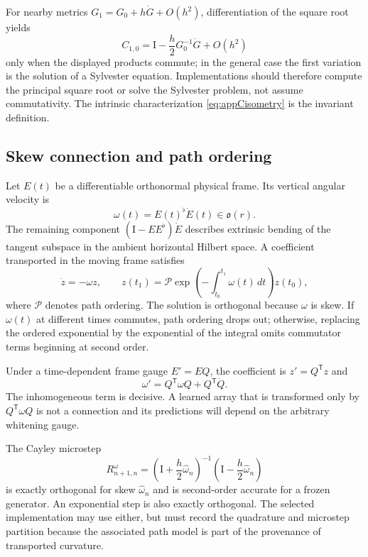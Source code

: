 \documentclass[10pt,twocolumn]{article}
\theoremstyle{definition}
\theoremstyle{remark}
\newcommand{\Id}{\mathrm I}
\begin{document}
For nearby metrics $G_1=G_0+h\dot G+O(h^2)$, differentiation of the square
root yields
\begin{equation}
 C_{1,0}=\Id-\frac{h}{2}G_0^{-1}\dot G+O(h^2)
 \label{eq:appClocal}
\end{equation}
only when the displayed products commute; in the general case the first
variation is the solution of a Sylvester equation.  Implementations should
therefore compute the principal square root or solve the Sylvester problem,
not assume commutativity.  The intrinsic characterization
\eqref{eq:appCisometry} is the invariant definition.

\subsection{Skew connection and path ordering}

Let $E(t)$ be a differentiable orthonormal physical frame.  Its vertical
angular velocity is
\begin{equation}
 \omega(t)=E(t)^\flat\dot E(t)\in\mathfrak o(r).
 \label{eq:appomega}
\end{equation}
The remaining component
$(\Id-E E^\flat)\dot E$ describes extrinsic bending of the tangent subspace in
the ambient horizontal Hilbert space.  A coefficient transported in the
moving frame satisfies
\begin{equation}
 \dot z=-\omega z,\qquad
 z(t_1)=\mathcal P\exp\!\left(-\int_{t_0}^{t_1}\omega(t)\,dt\right)z(t_0),
 \label{eq:apppathordered}
\end{equation}
where $\mathcal P$ denotes path ordering.  The solution is orthogonal because
$\omega$ is skew.  If $\omega(t)$ at different times commutes, path ordering
drops out; otherwise, replacing the ordered exponential by the exponential
of the integral omits commutator terms beginning at second order.

Under a time-dependent frame gauge $E'=EQ$, the coefficient is
$z'=Q^{\mathsf T}z$ and
\begin{equation}
 \omega'=Q^{\mathsf T}\omega Q+Q^{\mathsf T}\dot Q.
 \label{eq:appomegagauge}
\end{equation}
The inhomogeneous term is decisive.  A learned array that is transformed only
by $Q^{\mathsf T}\omega Q$ is not a connection and its predictions will depend
on the arbitrary whitening gauge.

The Cayley microstep
\begin{equation}
 R^\omega_{n+1,n}
 =\left(\Id+\frac{h}{2}\widehat\omega_n\right)^{-1}
  \left(\Id-\frac{h}{2}\widehat\omega_n\right)
 \label{eq:appcayley}
\end{equation}
is exactly orthogonal for skew $\widehat\omega_n$ and is second-order accurate
for a frozen generator.  An exponential step is also exactly orthogonal.
The selected implementation may use either, but must record the quadrature
and microstep partition because the associated path model is part of the
provenance of transported curvature.
\end{document}
